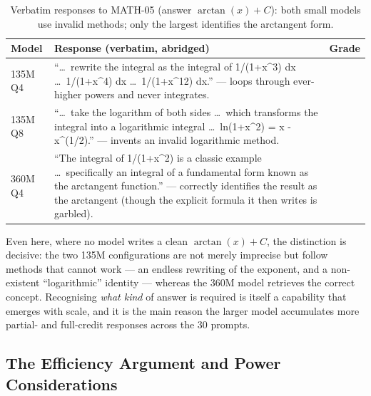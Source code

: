\begin{table}[H]
\centering
\caption{Verbatim responses to MATH-05 (answer $\arctan(x)+C$): both small models use invalid
methods; only the largest identifies the arctangent form.}
\label{tab:p4-example2}
\renewcommand{\arraystretch}{1.3}
\begin{tabular}{@{}>{\raggedright\arraybackslash}p{} >{\raggedright\arraybackslash}p{} >{\centering\arraybackslash}p{}@{}}
\toprule
\textbf{Model} & \textbf{Response (verbatim, abridged)} & \textbf{Grade} \\
\midrule
135M Q4 &
``\dots\ rewrite the integral as the integral of 1/(1+x\textasciicircum 3) dx \dots\ 1/(1+x\textasciicircum 4) dx
\dots\ 1/(1+x\textasciicircum 12) dx.'' --- loops through ever-higher powers and never integrates.
& 0 \\
\midrule
135M Q8 &
``\dots\ take the logarithm of both sides \dots\ which transforms the integral into a logarithmic
integral \dots\ ln(1+x\textasciicircum 2) = x - x\textasciicircum(1/2).'' --- invents an invalid
logarithmic method.
& 0 \\
\midrule
360M Q4 &
``The integral of 1/(1+x\textasciicircum 2) is a classic example \dots\ specifically an integral of a
fundamental form known as the arctangent function.'' --- correctly identifies the result as the
arctangent (though the explicit formula it then writes is garbled).
& 1 \\
\bottomrule
\end{tabular}
\end{table}

Even here, where no model writes a clean $\arctan(x)+C$, the distinction is decisive: the two 135M
configurations are not merely imprecise but follow methods that cannot work --- an endless rewriting
of the exponent, and a non-existent ``logarithmic'' identity --- whereas the 360M model retrieves the
correct concept. Recognising \emph{what kind} of answer is required is itself a capability that
emerges with scale, and it is the main reason the larger model accumulates more partial- and
full-credit responses across the 30 prompts.

\subsection{The Efficiency Argument and Power Considerations}

